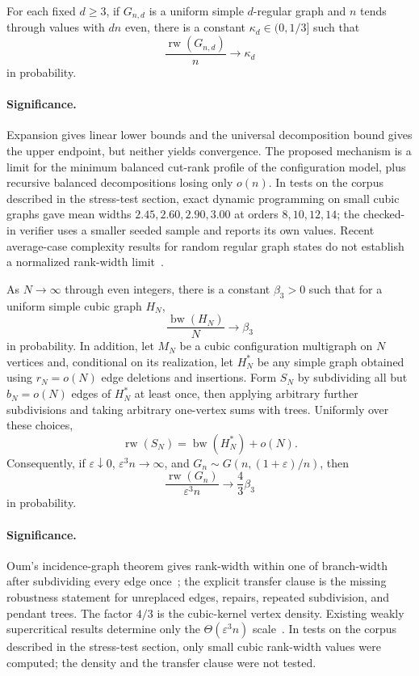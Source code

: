 \begin{conjecture}\label{as11}
For each fixed $d\ge3$, if $G_{n,d}$ is a uniform simple $d$-regular graph
and $n$ tends through values with $dn$ even, there is a constant
$\kappa_d\in(0,1/3]$ such that
\[
 \frac{\operatorname{rw}(G_{n,d})}{n}\longrightarrow\kappa_d
\]
in probability.
\end{conjecture}

\paragraph{Significance.}
Expansion gives linear lower bounds and the universal decomposition bound
gives the upper endpoint, but neither yields convergence.  The proposed
mechanism is a limit for the minimum balanced cut-rank profile of the
configuration model, plus recursive balanced decompositions losing only
$o(n)$.  In tests on the corpus described in the stress-test section, exact dynamic
programming on small cubic graphs gave mean widths $2.45,2.60,2.90,3.00$ at
orders $8,10,12,14$; the
checked-in verifier uses a smaller seeded sample and reports its own values.
Recent average-case complexity results for random regular graph states do not
establish a normalized rank-width limit~\cite{GhoshHangleiterHelsen25}.

\begin{conjecture}\label{as12}
As $N\to\infty$ through even integers, there is a constant $\beta_3>0$ such
that for a uniform simple cubic graph $H_N$,
\[
 \frac{\operatorname{bw}(H_N)}N\longrightarrow\beta_3
\]
in probability.  In addition, let $M_N$ be a cubic configuration multigraph
on $N$ vertices and, conditional on its realization, let $H_N^*$ be any
simple graph obtained using $r_N=o(N)$ edge deletions and insertions.  Form
$S_N$ by subdividing all but $b_N=o(N)$ edges of $H_N^*$ at least once,
then applying arbitrary further subdivisions and taking arbitrary one-vertex
sums with trees.  Uniformly over these choices,
\[
 \operatorname{rw}(S_N)=\operatorname{bw}(H_N^*)+o(N).
\]
Consequently, if $\varepsilon\downarrow0$, $\varepsilon^3n\to\infty$, and
$G_n\sim G(n,(1+\varepsilon)/n)$, then
\[
 \frac{\operatorname{rw}(G_n)}{\varepsilon^3n}
 \longrightarrow \frac43\beta_3
\]
in probability.
\end{conjecture}

\paragraph{Significance.}
Oum's incidence-graph theorem gives rank-width within one of branch-width
after subdividing every edge once~\cite{Oum08}; the explicit transfer clause
is the missing robustness statement for unreplaced edges, repairs, repeated
subdivision, and pendant trees.  The factor $4/3$ is the cubic-kernel vertex
density.  Existing weakly supercritical results determine only the
$\Theta(\varepsilon^3n)$ scale~\cite{DoErdeKang24}.  In tests on the corpus described in the stress-test section, only small cubic rank-width values
were computed; the density and the transfer clause were not tested.

